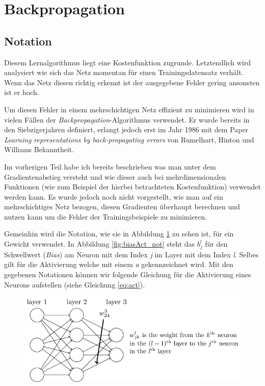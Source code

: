 \section{Backpropagation} \label{sec:backprop}

\subsection{Notation} \label{ss:notationBP}
Diesem Lernalgorithmus liegt eine Kostenfunktion zugrunde. Letztendlich wird analysiert wie sich das Netz momentan für einen Trainingsdatensatz verhält. Wenn das Netz diesen richtig erkennt ist der ausgegebene Fehler gering ansonsten ist er hoch.

Um diesen Fehler in einem mehrschichtigen Netz effizient zu minimieren wird in vielen Fällen der \emph{Backpropagation}-Algorithmus verwendet. Er wurde bereits in den Siebzigerjahren definiert, erlangt jedoch erst im Jahr 1986 mit dem Paper \emph{Learning representations by back-propagating errors} von Rumelhart, Hinton und Williams Bekanntheit.

Im vorherigen Teil habe ich bereits beschrieben was man unter dem Gradientenabstieg versteht und wie dieser auch bei mehrdimensionalen Funktionen (wie zum Beispiel der hierbei betrachteten Kostenfunktion) verwendet werden kann. Es wurde jedoch noch nicht vorgestellt, wie man auf ein mehrschichtiges Netz bezogen, diesen Gradienten überhaupt berechnen und nutzen kann um die Fehler der Trainingsbeispiele zu minimieren.

Gemeinhin wird die Notation, wie sie in Abbildung \ref{fig:weight_not} zu sehen ist, für ein Gewicht verwendet. In Abbildung \ref{fig:biasAct_not} steht das $b^l_j$ für den Schwellwert (\emph{Bias}) am Neuron mit dem Index \emph{j} im Layer mit dem Index \emph{l}. Selbes gilt für die Aktivierung welche mit einem \emph{a} gekennzeichnet wird. Mit den gegebenen Notationen können wir folgende Gleichung für die Aktivierung eines Neurons aufstellen (siehe Gleichung \ref{eq:act}).

\begin{figure}[!htb]
	\centering
	\includegraphics[width=.7\linewidth]{img/weight_notation}
	\label{fig:weight_not}
\end{figure}

